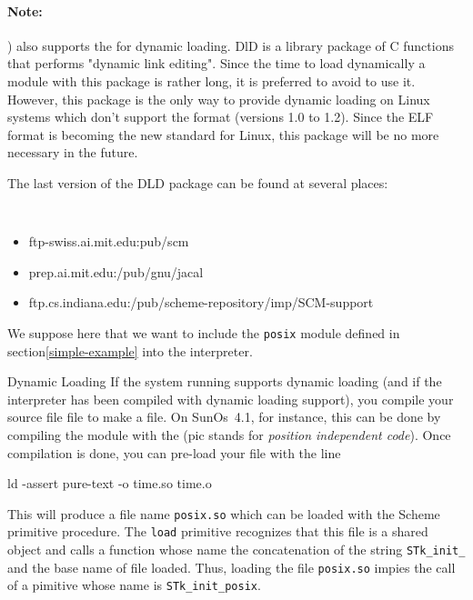 \documentclass[10pt]{article}
\begin{document}
\paragraph*{Note:} {\stk) also supports the  for
dynamic loading. DlD is a library package of C functions that performs
"dynamic link editing".  Since the time to load dynamically a module
with this package is rather long, it is preferred to avoid to use it.
However, this package is the only way to provide dynamic loading on
Linux systems which don't support the  format (versions 1.0
to 1.2). Since the ELF format is becoming the new standard for Linux,
this package will be no more necessary in the future.

The last version of the DLD package can be found at several places:
{\tt
\begin{itemize}
\item ftp-swiss.ai.mit.edu:pub/scm
\item prep.ai.mit.edu:/pub/gnu/jacal
\item ftp.cs.indiana.edu:/pub/scheme-repository/imp/SCM-support
\end{itemize}
}

We suppose here that we want to include the {\tt posix} module defined
in section\ref{simple-example} into the {\stk} interpreter. 
\begin{Lentry}

\item [Dynamic Loading]
If the system running {\stk} supports dynamic loading (and if the
interpreter has been compiled with dynamic loading support), you
compile your source file file to make a {\em {}}
file. On SunOs~4.1, for instance, this can be done by compiling the
module with the {\em {}} (pic stands for 
{\em position independent code}). Once compilation is done, you can
pre-load your file with the line
\begin{Code}
\begin{listing}[200]{2}
ld -assert pure-text -o time.so time.o
\end{listing}
\end{Code}
This will produce a file name {\tt posix.so} which can be loaded with the 
 Scheme primitive procedure. The {\tt load} primitive recognizes
that this file is a shared object and calls a function whose
name the concatenation of the string 
{\tt STk\_init\_} and the base name of file
loaded. Thus, loading the file {\tt posix.so} impies the call of a
pimitive whose name is {\tt STk\_init\_posix}. 


\end{Lentry}}
\end{document}

